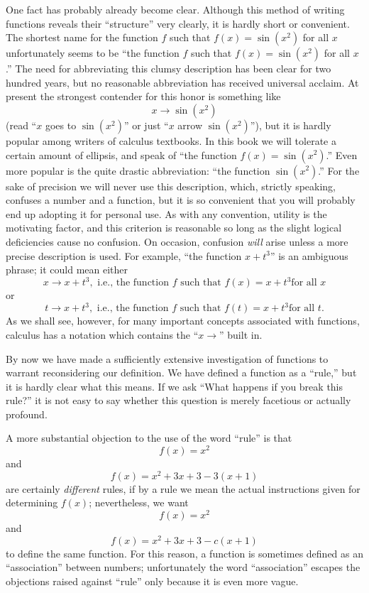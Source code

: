 One fact has probably already become clear. Although this method of writing
functions reveals their ``structure'' very clearly, it is hardly short or
convenient. The shortest name for the function $f$ such that
$f(x) = \sin(x^2)$ for all $x$ unfortunately seems to be ``the function $f$
such that $f(x) = \sin(x^2)$ for all $x$.'' The need for abbreviating this
clumsy description has been clear for two hundred years, but no reasonable
abbreviation has received universal acclaim. At present the strongest
contender for this honor is something like
\[
x \to \sin(x^2)
\]
(read ``$x$ goes to $\sin(x^2)$'' or just ``$x$ arrow $\sin(x^2)$''), but it is
hardly popular among writers of calculus textbooks. In this book we will
tolerate a certain amount of ellipsis, and speak of ``the function
$f(x) = \sin(x^2)$.'' Even more popular is the quite drastic abbreviation:
``the function $\sin(x^2)$.'' For the sake of precision we will never use this
description, which, strictly speaking, confuses a number and a function, but
it is so convenient that you will probably end up adopting it for personal
use. As with any convention, utility is the motivating factor, and this
criterion is reasonable so long as the slight logical deficiencies cause no
confusion. On occasion, confusion \emph{will} arise unless a more precise
description is used. For example, ``the function $x + t^3$'' is an ambiguous
phrase; it could mean either
\[
x \to x + t^3,\text{ i.e., the function $f$ such that $f(x) = x + t^3$
for all $x$}
\]
or
\[
t \to x + t^3,\text{ i.e., the function $f$ such that $f(t) = x + t^3$
for all $t$}.
\]
As we shall see, however, for many important concepts associated with
functions, calculus has a notation which contains the ``$x \to$'' built in.

By now we have made a sufficiently extensive investigation of functions to
warrant reconsidering our definition. We have defined a function as a
``rule,'' but it is hardly clear what this means. If we ask ``What happens if
you break this rule?'' it is not easy to say whether this question is merely
facetious or actually profound.

A more substantial objection to the use of the word ``rule'' is that
\[
f(x) = x^2
\]
and
\[
f(x) = x^2 + 3x + 3 - 3(x+1)
\]
are certainly \emph{different} rules, if by a rule we mean the actual
instructions given for determining $f(x)$; nevertheless, we want
\[
f(x) = x^2
\]
and
\[
f(x) = x^2 + 3x + 3 - c(x+1)
\]
to define the same function. For this reason, a function is sometimes defined
as an ``association'' between numbers; unfortunately the word ``association''
escapes the objections raised against ``rule'' only because it is even more
vague.


